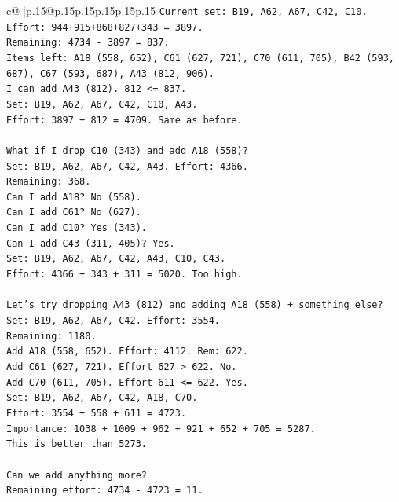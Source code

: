 \documentclass{article}
\begin{document}
{\begin{supertabular}{c@{$\;$}|p{.15\linewidth}@{}p{.15\linewidth}p{.15\linewidth}p{.15\linewidth}p{.15\linewidth}p{.15\linewidth}}
{{{\texttt{Current set: B19, A62, A67, C42, C10. Effort: 944+915+868+827+343 = 3897.} \\
\texttt{Remaining: 4734 {-} 3897 = 837.} \\
\texttt{Items left: A18 (558, 652), C61 (627, 721), C70 (611, 705), B42 (593, 687), C67 (593, 687), A43 (812, 906).} \\
\texttt{I can add A43 (812). 812 <= 837.} \\
\texttt{Set: B19, A62, A67, C42, C10, A43.} \\
\texttt{Effort: 3897 + 812 = 4709. Same as before.} \\
\\ 
\texttt{What if I drop C10 (343) and add A18 (558)?} \\
\texttt{Set: B19, A62, A67, C42, A43. Effort: 4366.} \\
\texttt{Remaining: 368.} \\
\texttt{Can I add A18? No (558).} \\
\texttt{Can I add C61? No (627).} \\
\texttt{Can I add C10? Yes (343).} \\
\texttt{Can I add C43 (311, 405)? Yes.} \\
\texttt{Set: B19, A62, A67, C42, A43, C10, C43.} \\
\texttt{Effort: 4366 + 343 + 311 = 5020. Too high.} \\
\\ 
\texttt{Let's try dropping A43 (812) and adding A18 (558) + something else?} \\
\texttt{Set: B19, A62, A67, C42. Effort: 3554.} \\
\texttt{Remaining: 1180.} \\
\texttt{Add A18 (558, 652). Effort: 4112. Rem: 622.} \\
\texttt{Add C61 (627, 721). Effort 627 > 622. No.} \\
\texttt{Add C70 (611, 705). Effort 611 <= 622. Yes.} \\
\texttt{Set: B19, A62, A67, C42, A18, C70.} \\
\texttt{Effort: 3554 + 558 + 611 = 4723.} \\
\texttt{Importance: 1038 + 1009 + 962 + 921 + 652 + 705 = 5287.} \\
\texttt{This is better than 5273.} \\
\\ 
\texttt{Can we add anything more?} \\
\texttt{Remaining effort: 4734 {-} 4723 = 11.} \\
}}}
\end{supertabular}}
\end{document}
